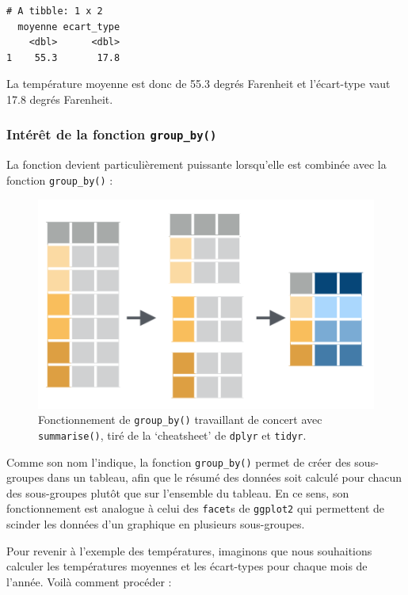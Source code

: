 \documentclass[a4paperpaper,]{article}
\begin{document}
\begin{verbatim}
# A tibble: 1 x 2
  moyenne ecart_type
    <dbl>      <dbl>
1    55.3       17.8
\end{verbatim}

La température moyenne est donc de 55.3 degrés Farenheit et l'écart-type vaut 17.8 degrés Farenheit.

\hypertarget{interet-de-la-fonction-group_by}{%
\subsubsection{\texorpdfstring{Intérêt de la fonction \texttt{group\_by()}}{Intérêt de la fonction group\_by()}}\label{interet-de-la-fonction-group_by}}

La fonction devient particulièrement puissante lorsqu'elle est combinée avec la fonction \texttt{group\_by()} :

\begin{figure}[htpb]

{\centering \includegraphics[width=0.65\linewidth]{images/groupby} 

}

\caption{Fonctionnement de \texttt{group\_by()} travaillant de concert avec \texttt{summarise()}, tiré de la `cheatsheet' de \texttt{dplyr} et \texttt{tidyr}.}\label{fig:groupby}
\end{figure}



Comme son nom l'indique, la fonction \texttt{group\_by()} permet de créer des sous-groupes dans un tableau, afin que le résumé des données soit calculé pour chacun des sous-groupes plutôt que sur l'ensemble du tableau. En ce sens, son fonctionnement est analogue à celui des \texttt{facet}s de \texttt{ggplot2} qui permettent de scinder les données d'un graphique en plusieurs sous-groupes.

Pour revenir à l'exemple des températures, imaginons que nous souhaitions calculer les températures moyennes et les écart-types pour chaque mois de l'année. Voilà comment procéder :
\end{document}
